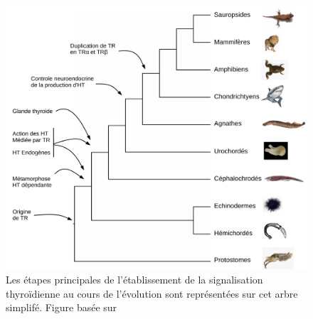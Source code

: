 \begin{figure}[!htb]
\centering
\vspace{1\baselineskip}
\includegraphics[width=\textwidth]
{Figures/ht-tree/ht-tree.pdf}
\caption[Évolution la signalisation thyroïdienne]
{
Les étapes principales de l'établissement de la signalisation thyroïdienne au cours de l'évolution sont représentées sur cet arbre simplifé.
Figure basée sur \citet{Paris2008}
}
\label{fig:ht-tree}
\end{figure}